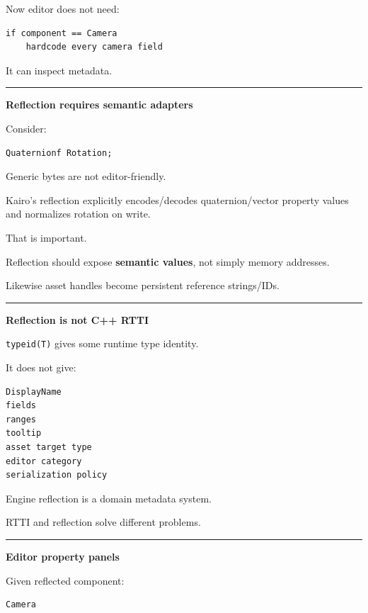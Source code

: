 Now editor does not need:

\begin{verbatim}
if component == Camera
    hardcode every camera field
\end{verbatim}

It can inspect metadata.

\begin{center}\rule{0.5\linewidth}{0.5pt}\end{center}

\textbf{Reflection requires semantic adapters}

Consider:

\begin{verbatim}
Quaternionf Rotation;
\end{verbatim}

Generic bytes are not editor-friendly.

Kairo's reflection explicitly encodes/decodes quaternion/vector property values and normalizes rotation on write.

That is important.

Reflection should expose \textbf{semantic values}, not simply memory addresses.

Likewise asset handles become persistent reference strings/IDs.

\begin{center}\rule{0.5\linewidth}{0.5pt}\end{center}

\textbf{Reflection is not C++ RTTI}

\texttt{typeid(T)} gives some runtime type identity.

It does not give:

\begin{verbatim}
DisplayName
fields
ranges
tooltip
asset target type
editor category
serialization policy
\end{verbatim}

Engine reflection is a domain metadata system.

RTTI and reflection solve different problems.

\begin{center}\rule{0.5\linewidth}{0.5pt}\end{center}

\textbf{Editor property panels}

Given reflected component:

\begin{verbatim}
Camera
\end{verbatim}

